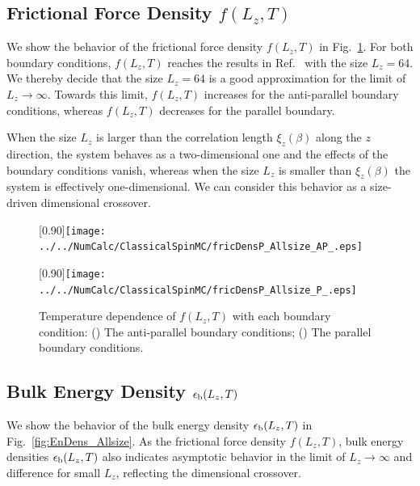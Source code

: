 \subsection{Frictional Force Density $f(L_{z}, T)$}

We show the behavior of the frictional force density $f(L_{z}, T)$ in Fig.~\ref{fig:fricDens_Allsize}. For both boundary conditions, $f(L_{z}, T)$ reaches the results in Ref.~\cite{Kadau2008} with the size $L_{z}=64$. We thereby decide that the size $L_{z}=64$ is a good approximation for the limit of $L_{z}\to\infty$. Towards this limit, $f(L_{z}, T)$ increases for the anti-parallel boundary conditions, whereas $f(L_{z}, T)$ decreases for the parallel boundary. 

When the size $L_{z}$ is larger than the correlation length $\xi_{z}(\beta)$ along the $z$ direction, the system behaves as a two-dimensional one and the effects of the boundary conditions vanish, whereas when the size $L_{z}$ is smaller than $\xi_{z}(\beta)$ the system is effectively one-dimensional. We can consider this behavior as a size-driven dimensional crossover. 

\begin{figure}[htbp]
	\centering
	\subcaptionbox{\label{fig:fricDens_Allsize_AP}}[0.90\linewidth]{\texttt{[image: ../../NumCalc/ClassicalSpinMC/fricDensP\_Allsize\_AP\_.eps]}}
	
	\subcaptionbox{\label{fig:fricDens_Allsize_P}}[0.90\linewidth]{\texttt{[image: ../../NumCalc/ClassicalSpinMC/fricDensP\_Allsize\_P\_.eps]}}
	
	\caption{Temperature dependence of $f(L_{z}, T)$ with each boundary condition: () The anti-parallel boundary conditions; () The parallel boundary conditions.}
	\label{fig:fricDens_Allsize}
\end{figure}



\subsection{Bulk Energy Density $\epsilon_{\rm b}(L_{z}, T)$}

We show the behavior of the bulk energy density $\epsilon_{\rm b}(L_{z}, T)$ in Fig.~\ref{fig:EnDens_Allsize}. As the frictional force density $f(L_{z}, T)$, bulk energy densities $\epsilon_{\rm b}(L_{z}, T)$ also indicates asymptotic behavior in the limit of $L_{z}\to\infty$ and difference for small $L_{z}$, reflecting the dimensional crossover.

